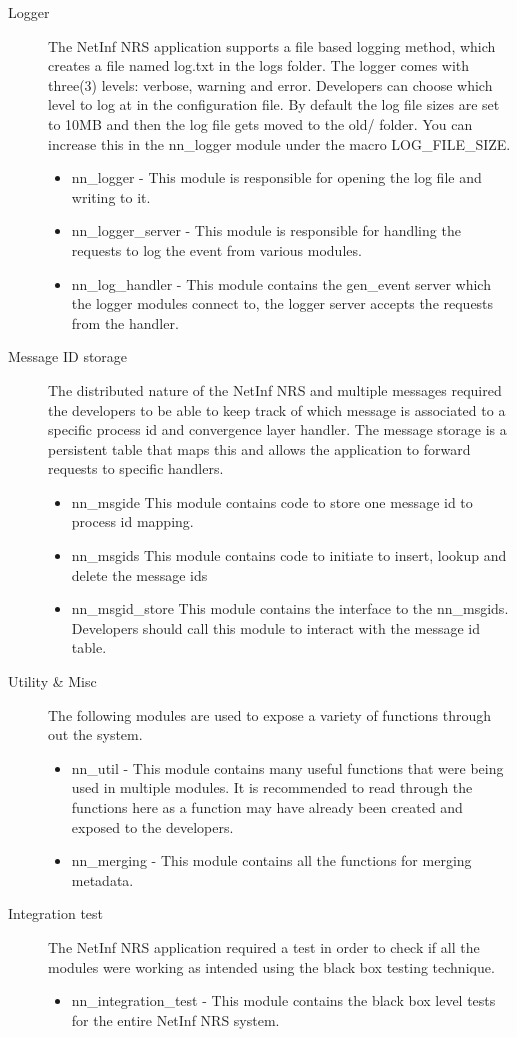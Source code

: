 \begin{description}
\item[Logger]
The NetInf NRS application supports a file based logging method, which creates a file named log.txt in the logs folder. The logger comes with three(3) 
levels: verbose, warning and error. Developers can choose which level to log at in the configuration file. By default the log file sizes are set to 10MB 
and then the log file gets moved to the old/ folder. You can increase this in the nn\_logger module under the macro LOG\_FILE\_SIZE.
\begin{itemize}
\item nn\_logger - This module is responsible for opening the log file and writing to it.
\item nn\_logger\_server - This module is responsible for handling the requests to log the event from various modules.
\item nn\_log\_handler - This module contains the gen\_event server which the logger modules connect to, the logger server accepts the requests from the handler.
\end{itemize}
\item [Message ID storage]
The distributed nature of the NetInf NRS and multiple messages required the developers to be able to keep track of which message is associated to a 
specific process id and convergence layer handler. The message storage is a persistent table that maps this and allows the application to forward requests to specific handlers. 
\begin{itemize}
\item nn\_msgide This module contains code to store one message id to process id mapping. 
\item nn\_msgids This module contains code to initiate to insert, lookup and delete the message ids
\item nn\_msgid\_store This module contains the interface to the nn\_msgids. Developers should call this module to interact with the message id table.
\end{itemize}
\item [Utility \& Misc]
The following modules are used to expose a variety of functions through out the system.
\begin{itemize}
\item nn\_util - This module contains many useful functions that were being used in multiple modules. It is recommended to read through the functions 
here as a function may have already been created and exposed to the developers.
\item nn\_merging - This module contains all the functions for merging metadata.
\end {itemize}
\item [Integration test]
The NetInf NRS application required a test in order to check if all the modules were working as intended using the black box testing technique. 
\begin{itemize}
\item nn\_integration\_test - This module contains the black box level tests for the entire NetInf NRS system.
\end{itemize}

\end{description}

